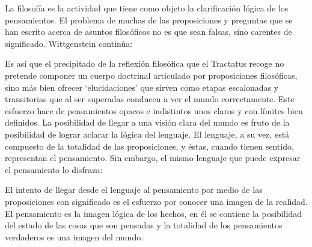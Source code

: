 
La filosofía es la actividad que tiene como objeto la clarificación lógica
de los pensamientos.\autocite[4.112 p. 52]{tractatus} El problema de muchas de
las proposiciones y preguntas que se han escrito acerca de asuntos filosóficos
no es que sean falsas, sino carentes de significado. Wittgenstein continúa: 

Es así que el precipitado de la reflexión filosófica que el Tractatus recoge no
pretende componer un cuerpo doctrinal articulado por proposiciones filosóficas,
sino más bien ofrecer `elucidaciones' que sirven como etapas escalonadas y
transitorias que al ser superadas conducen a ver el mundo correctamente. Este
esfuerzo hace de pensamientos opacos e indistintos unos claros y con límites
bien definidos.\autocite[cf. 4.112 y 6.54]{tractatus} 
La posibilidad de llegar a una visión clara del mundo es fruto de la posibilidad
de lograr aclarar la lógica del lenguaje. El lenguaje, a su vez, está compuesto
de la totalidad de las proposiciones, y éstas, cuando tienen sentido,
representan el pensamiento.\autocite[cf. 4 y 4.001]{tractatus} 
Sin embargo, el mismo lenguaje que puede expresar el pensamiento lo disfraza:


El intento de llegar desde el lenguaje al pensamiento por medio de las
proposiciones con significado es el esfuerzo por conocer una imagen de la
realidad. El pensamiento es la imagen lógica de los hechos, en él se contiene la
posibilidad del estado de las cosas que son pensadas y la totalidad de los
pensamientos verdaderos es una imagen del mundo.\autocite[cf.][3 y
3.001]{tractatus}

